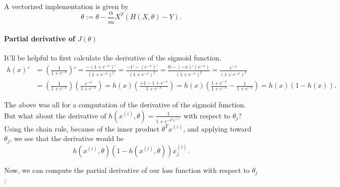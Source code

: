\documentclass[12pt]{article}
\begin{document}
A vectorized implementation is given by
\[
  \theta := \theta - \frac{\alpha}{m} X^T \left(H(X,\theta) - Y\right).
\]

\paragraph{Partial derivative of $J(\theta)$} It'll be helpful to first calculate the derivative of the sigmoid function.
\begin{align*}
  h(x)' &= \left( \frac{1}{1 + e^{-x}} \right)' = \frac{-(1 + e^{-x})'}{(1 + e^{-x})^2} = \frac{-1' - (e^{-x})'}{(1 + e^{-x})^2} = \frac{0 -           (-x)'(e^{-x})}{(1 + e^{-x})^2} = \frac{e^{-x}}{(1 + e^{-x})^2} \\
        &= \left( \frac{1}{1 + e^{-x}} \right) \left( \frac{e^{-x}}{1 + e^{-x}} \right) = h(x) \left( \frac{+1 - 1 + e^{-x}}{1 + e^{-x}} \right) = h(x) \left(\frac{1+e^{-x}}{1+e^{-x}} - \frac{1}{1+e^{-x}}\right) = h(x) (1 - h(x)).
\end{align*}

The above was all for a computation of the derivative of the sigmoid function. But what about the derivative of $h(x^{(i)}, \theta) = \frac{1}{1 + e^{-\theta^T x^{(i)}}}$ with respect to $\theta_j$? Using the chain rule, because of the inner product $\theta^T x^{(i)}$, and applying toward $\theta_j$, we see that the derivative would be
\[
  h(x^{(i)},\theta)\left(1 - h(x^{(i)},\theta)\right) x_j^{(i)}.
\]

Now, we can compute the partial derivative of our loss function with respect to $\theta_j$:
\end{document}
